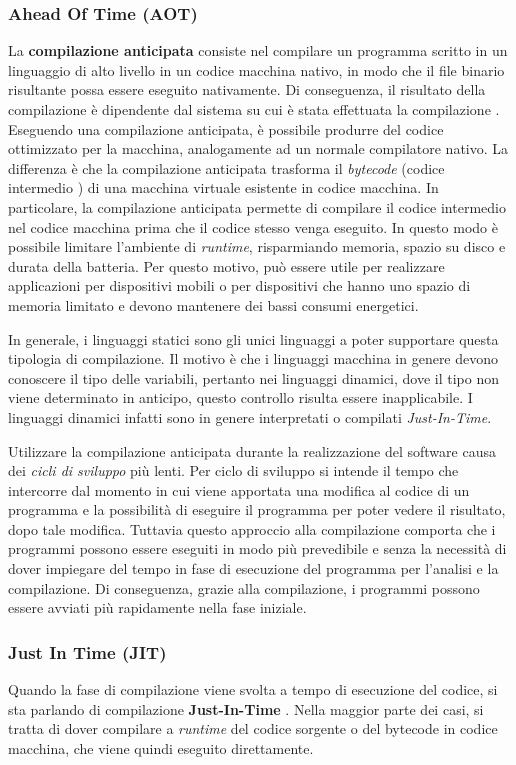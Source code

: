 \subsubsection{Ahead Of Time (AOT)}
La \textbf{compilazione anticipata} consiste nel compilare un programma scritto in un linguaggio di alto livello in un codice macchina nativo, in modo che il file binario risultante possa essere eseguito nativamente. Di conseguenza, il risultato della compilazione è dipendente dal sistema su cui è stata effettuata la compilazione \cite{aot}. Eseguendo una compilazione anticipata, è possibile produrre del codice ottimizzato per la macchina, analogamente ad un normale compilatore nativo. La differenza è che la compilazione anticipata trasforma il \textit{bytecode} (codice intermedio \cite{codice_intermedio}) di una macchina virtuale esistente in codice macchina. In particolare, la compilazione anticipata permette di compilare il codice intermedio nel codice macchina prima che il codice stesso venga eseguito. In questo modo è possibile limitare l'ambiente di \textit{runtime}, risparmiando memoria, spazio su disco e durata della batteria. Per questo motivo, può essere utile per realizzare applicazioni per dispositivi mobili o per dispositivi che hanno uno spazio di memoria limitato e devono mantenere dei bassi consumi energetici.

In generale, i linguaggi statici sono gli unici linguaggi a poter supportare questa tipologia di compilazione. Il motivo è che i linguaggi macchina in genere devono conoscere il tipo delle variabili, pertanto nei linguaggi dinamici, dove il tipo non viene determinato in anticipo, questo controllo risulta essere inapplicabile. I linguaggi dinamici infatti sono in genere interpretati o compilati \textit{Just-In-Time}.

Utilizzare la compilazione anticipata durante la realizzazione del software causa dei \textit{cicli di sviluppo} più lenti. Per ciclo di sviluppo si intende il tempo che intercorre dal momento in cui viene apportata una modifica al codice di un programma e la possibilità di eseguire il programma per poter vedere il risultato, dopo tale modifica. Tuttavia questo approccio alla compilazione comporta che i programmi possono essere eseguiti in modo più prevedibile e senza la necessità di dover impiegare del tempo in fase di esecuzione del programma per l'analisi e la compilazione. Di conseguenza, grazie alla compilazione, i programmi possono essere avviati più rapidamente nella fase iniziale. 

\subsubsection{Just In Time (JIT)}
Quando la fase di compilazione viene svolta a tempo di esecuzione del codice, si sta parlando di compilazione \textbf{Just-In-Time} \cite{jit}. Nella maggior parte dei casi, si tratta di dover compilare a \textit{runtime} del codice sorgente o del bytecode in codice macchina, che viene quindi eseguito direttamente.

